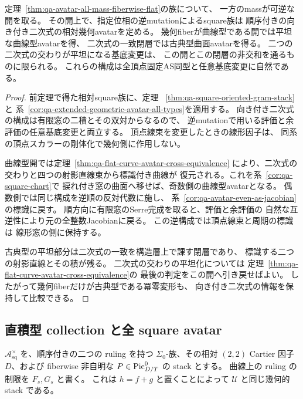 \begin{corollary}[可逆mass開での相対幾何逆復元]
\label{cor:qa-avatar-invertible-mass-geometric-reverse}
定理~\ref{thm:qa-avatar-all-mass-fiberwise-flat}の族について、
一方のmassが可逆な開を取る。
その開上で、指定位相の逆mutationによるsquare族は
順序付きの向き付き二次式の相対幾何avatarを定める。
幾何fiberが曲線型である開では平坦な曲線型avatarを得、
二次式の一致閉層では古典型曲面avatarを得る。
二つの二次式の交わりが平坦になる基底変更は、
この開とこの閉層の非交和を通るものに限られる。
これらの構成は全頂点固定AS同型と任意基底変更に自然である。
\end{corollary}
\begin{proof}
前定理で得た相対square族に、定理~
\ref{thm:qa-square-oriented-gram-stack}と
系~\ref{cor:qa-extended-geometric-avatar-all-types}を適用する。
向き付き二次式の構成は有限窓の二積とその双対からなるので、
逆mutationで用いる評価と余評価の任意基底変更と両立する。
頂点線束を変更したときの線形因子は、
同系の頂点スカラーの剛体化で幾何側に作用しない。

曲線型開では定理~\ref{thm:qa-flat-curve-avatar-cross-equivalence}
により、二次式の交わりと四つの射影直線束から標識付き曲線が
復元される。これを系~\ref{cor:qa-square-chart}で
捩れ付き窓の曲面へ移せば、奇数側の曲線型avatarとなる。
偶数側では同じ構成を逆順の反対代数に施し、
系~\ref{cor:qa-avatar-even-as-jacobian}の標識に戻す。
順方向に有限窓のSerre完成を取ると、評価と余評価の
自然な互逆性により元の全整数Jacobianに戻る。
この逆構成では頂点線束と周期の標識は
線形窓の側に保持する。

古典型の平坦部分は二次式の一致を構造層上で課す閉層であり、
標識する二つの射影直線とその積が残る。
二次式の交わりの平坦化については
定理~\ref{thm:qa-flat-curve-avatar-cross-equivalence}の
最後の判定をこの開へ引き戻せばよい。
したがって幾何fiberだけが古典型である冪零変形も、
向き付き二次式の情報を保持して比較できる。
\end{proof}

\subsection{直積型 collection と全 square avatar}

$\mathcal A_{\mathrm{sq}}^{\times}$ を、順序付きの二つの ruling を持つ
$\Sigma _0$-族、その相対 $(2,2)$ Cartier 因子 $D$、および fiberwise 非自明な
$P\in\operatorname{Pic}^0_{D/T}$ の stack とする。
曲線上の ruling の制限を $F_s,G_s$ と書く。
これは $h=f+g$ と置くことによって $\mathcal U$ と同じ幾何的 stack である。

